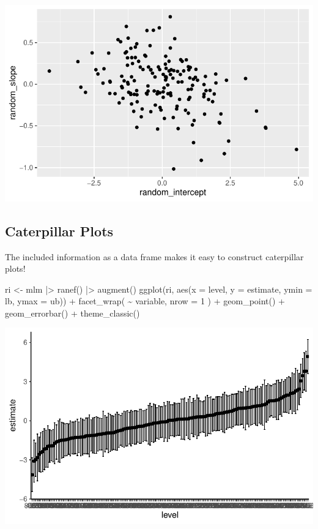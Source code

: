 \documentclass[
  letterpaper,
  DIV=11,
  numbers=noendperiod]{scrreprt}
\newenvironment{Shaded}{}{}
\newcommand{\AttributeTok}[1]{\textcolor[rgb]{0.49,0.56,0.16}{#1}}
\newcommand{\DecValTok}[1]{\textcolor[rgb]{0.25,0.63,0.44}{#1}}
\newcommand{\FunctionTok}[1]{\textcolor[rgb]{0.02,0.16,0.49}{#1}}
\newcommand{\NormalTok}[1]{#1}
\newcommand{\OtherTok}[1]{\textcolor[rgb]{0.00,0.44,0.13}{#1}}
\newcommand{\SpecialCharTok}[1]{\textcolor[rgb]{0.25,0.44,0.63}{#1}}
\begin{document}
\includegraphics{broom_files/figure-pdf/unnamed-chunk-10-1.pdf}

\subsection{Caterpillar Plots}\label{caterpillar-plots}

The included information as a data frame makes it easy to construct
caterpillar plots!

\begin{Shaded}
\begin{Highlighting}[]
\NormalTok{ri }\OtherTok{\textless{}{-}}\NormalTok{ mlm }\SpecialCharTok{|\textgreater{}} 
  \FunctionTok{ranef}\NormalTok{() }\SpecialCharTok{|\textgreater{}} 
  \FunctionTok{augment}\NormalTok{() }
\FunctionTok{ggplot}\NormalTok{(ri, }\FunctionTok{aes}\NormalTok{(}\AttributeTok{x =}\NormalTok{ level, }\AttributeTok{y =}\NormalTok{ estimate,}
               \AttributeTok{ymin =}\NormalTok{ lb,}
               \AttributeTok{ymax =}\NormalTok{ ub)) }\SpecialCharTok{+}
  \FunctionTok{facet\_wrap}\NormalTok{( }\SpecialCharTok{\textasciitilde{}}\NormalTok{ variable, }\AttributeTok{nrow =} \DecValTok{1}\NormalTok{ ) }\SpecialCharTok{+}
  \FunctionTok{geom\_point}\NormalTok{() }\SpecialCharTok{+}
  \FunctionTok{geom\_errorbar}\NormalTok{() }\SpecialCharTok{+}
  \FunctionTok{theme\_classic}\NormalTok{()}
\end{Highlighting}
\end{Shaded}

\includegraphics{broom_files/figure-pdf/unnamed-chunk-11-1.pdf}
\end{document}
